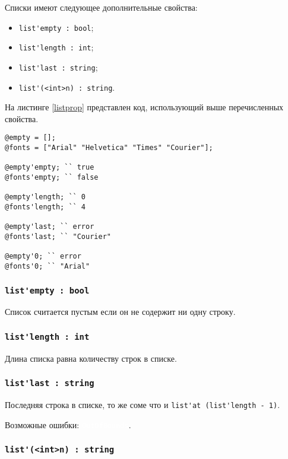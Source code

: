 \documentclass[a4paper, 14pt]{extarticle}
\newcommand{\ferror}[1]{{\fontsize{11pt}{12pt} \tt \colorbox{function}{\textcolor{white}{#1}}}}
\newenvironment{icItems}
	{ \begin{itemize} [noitemsep,nolistsep] }
	{ \end{itemize} }
\begin{document}
Списки имеют следующее дополнительные свойства:
\begin{icItems}
\item
	\lstinline|list'empty : bool|;
\item
	\lstinline|list'length : int|;
\item
	\lstinline|list'last : string|;
\item
	\lstinline|list'(<int>n) : string|.
\end{icItems}

На листинге \ref{listprop} представлен код, использующий выше перечисленных свойства.

\begin{lstlisting}[caption=Свойства класса list, label=listprop]
@empty = [];
@fonts = ["Arial" "Helvetica" "Times" "Courier"];

@empty'empty; `` true
@fonts'empty; `` false

@empty'length; `` 0
@fonts'length; `` 4

@empty'last; `` error
@fonts'last; `` "Courier"

@empty'0; `` error
@fonts'0; `` "Arial"
\end{lstlisting}

\subsubsection{\lstinline|list'empty : bool|}

Список считается пустым если он не содержит ни одну строку.

\subsubsection{\lstinline|list'length : int|}

Длина списка равна количеству строк в списке.

\subsubsection{\lstinline|list'last : string|}

Последняя строка в списке, то же соме что и \lstinline|list'at (list'length - 1)|.

Возможные ошибки: \ferror{OutOfBounds}.

\subsubsection{\lstinline|list'(<int>n) : string|}
\end{document}

